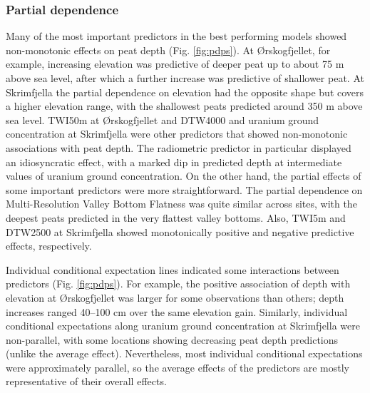\documentclass[soil, manuscript]{copernicus}
\begin{document}
\subsubsection{Partial dependence}

Many of the most important predictors in the best performing models showed non-monotonic effects on peat depth (Fig. \ref{fig:pdps}).
At Ørskogfjellet, for example, increasing elevation was predictive of deeper peat up to about 75 m above sea level, after which a further increase was predictive of shallower peat.
At Skrimfjella the partial dependence on elevation had the opposite shape but covers a higher elevation range, with the shallowest peats predicted around 350 m above sea level.
TWI50m at Ørskogfjellet and DTW4000 and uranium ground concentration at Skrimfjella were other predictors that showed non-monotonic associations with peat depth.
The radiometric predictor in particular displayed an idiosyncratic effect, with a marked dip in predicted depth at intermediate values of uranium ground concentration.
On the other hand, the partial effects of some important predictors were more straightforward.
The partial dependence on Multi-Resolution Valley Bottom Flatness was quite similar across sites, with the deepest peats predicted in the very flattest valley bottoms.
Also, TWI5m and DTW2500 at Skrimfjella showed monotonically positive and negative predictive effects, respectively.

Individual conditional expectation lines indicated some interactions between predictors (Fig. \ref{fig:pdps}).
For example, the positive association of depth with elevation at Ørskogfjellet was larger for some observations than others; depth increases ranged 40--100 cm over the same elevation gain.
Similarly, individual conditional expectations along uranium ground concentration at Skrimfjella were non-parallel, with some locations showing decreasing peat depth predictions (unlike the average effect).
Nevertheless, most individual conditional expectations were approximately parallel, so the average effects of the predictors are mostly representative of their overall effects.
\end{document}
